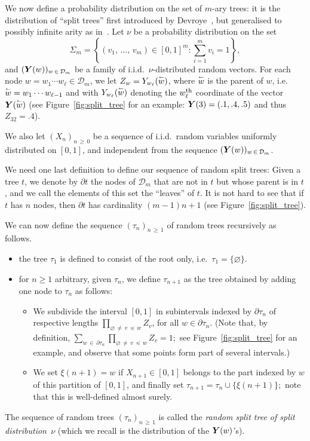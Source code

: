 \documentclass[AHL,Unicode,longabstracts,published]{cedram}
\newcommand{\bs}{\ensuremath{\boldsymbol}}
\newcommand{\sss}{\ensuremath{\scriptscriptstyle}}
\newcommand{\parent}{\overset{\sss\leftarrow}}
\newcommand{\clD}{\mathcal{D}}
\begin{document}
We now define a probability distribution on the set of $m$-ary trees: it is the distribution of ``split trees'' first introduced by Devroye~\cite{devroye-split}, but generalised to possibly infinite arity as in~\cite{Janson}. Let $\nu$ be a probability distribution on the set
\begin{equation}\label{eqSig}
\Sigma_m = \left\{(v_1, \,\ldots,\, v_m) \in [0,1]^m \colon \sum_{i=1}^m v_i = 1 \right\},
\end{equation}
and $(\bs Y(w))_{w\,\in\,\clD_m}$ be a family of i.i.d.\ $\nu$-distributed random vectors. For each node $w=w_1\cdots w_\ell\in \clD_m$, we let $Z_w = Y_{w_\ell}(\parent w)$, where $\parent w$ is the parent of $w$, i.e.\ $\parent w = w_1\cdots w_{\ell-1}$ and with $Y_{w_\ell}(\parent w)$ denoting the $w_\ell^{\rm th}$ coordinate of the vector $\bs Y(\parent w)$ (see Figure~\ref{fig:split_tree} for an example: $\bs Y(3) = (.1,.4,.5)$ and thus $Z_{32}=.4$).

We also let $(X_n)_{n\,\geq\,0}$ be a sequence of i.i.d.\ random variables uniformly distributed on $[0,1]$, and independent from the sequence $(\bs Y(w))_{w\,\in\,\clD_m}$.

We need one last definition to define our sequence of random split trees: Given a tree $t$, we denote by $\partial t$ the nodes of $\clD_m$ that are not in $t$ but whose parent is in $t$, and we call the elements of this set the ``leaves'' of $t$. It is not hard to see that if $t$ has $n$ nodes, then $\partial t$ has cardinality $(m-1)n+1$ (see Figure~\ref{fig:split_tree}).

We can now define the sequence $(\tau_n)_{n\,\geq\,1}$ of random trees recursively as follows.
\begin{itemize}
\item the tree $\tau_1$ is defined to consist of the root only, i.e.\ $\tau_1 = \{\varnothing\}$.
\item for $n\geq 1$ arbitrary, given $\tau_n$, we define $\tau_{n+1}$ as the tree obtained by adding one node to $\tau_n$ as follows:
\begin{itemize}
\item We subdivide the interval $[0,1]$ in subintervals indexed by $\partial\tau_n$ of respective lengths $\prod_{\varnothing\,\neq\,v\,\preccurlyeq\,w} Z_v$, for all $w\in\partial\tau_n$. (Note that, by definition, $\sum_{w\,\in\,\partial\tau_n}\prod_{\varnothing\,\neq\, v\,\preccurlyeq\,w} Z_v = 1;$ see Figure~\ref{fig:split_tree} for an example, and observe that some points form part of several intervals.)
\item We set $\xi(n+1) = w$ if $X_{n+1}\in [0,1]$ belongs to the part indexed by $w$ of this partition of $[0,1]$, and finally set $\tau_{n+1} = \tau_n \cup\{\xi(n+1)\};$ note that this is well-defined almost surely.
\end{itemize}
\end{itemize}
The sequence of random trees $(\tau_n)_{n\,\geq\,1}$ is called the {\em random split tree of split distribution~$\nu$} (which we recall is the distribution of the $\bs Y(w)$'s).
\end{document}
